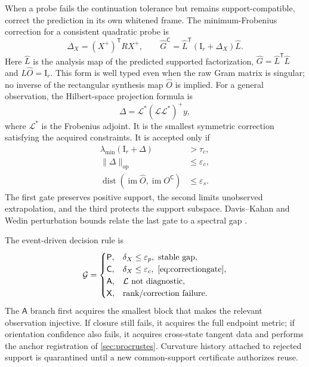 \documentclass[10pt,twocolumn]{article}
\newcommand{\cref}[1]{\autoref{#1}}
\theoremstyle{definition}
\theoremstyle{remark}
\newcommand{\Id}{\mathrm I}
\newcommand{\im}{\operatorname{im}}
\newcommand{\dist}{\operatorname{dist}}
\newcommand{\op}{\mathrm{op}}
\newcommand{\A}{\mathsf A}
\newcommand{\Prd}{\mathsf P}
\newcommand{\Cor}{\mathsf C}
\newcommand{\Inv}{\mathsf X}
\begin{document}
When a probe fails the continuation tolerance but remains support-compatible, correct the prediction in its own whitened frame.  The minimum-Frobenius correction for a consistent quadratic probe is
\begin{equation}
 \Delta_X=(X^+)^{\mathsf T}RX^+,\qquad
 \widehat G^{\Cor}=\widehat L^{\mathsf T}(\Id_r+\Delta_X)\widehat L.
 \label{eq:mincorrection}
\end{equation}
Here $\widehat L$ is the analysis map of the predicted supported factorization,
$\widehat G=\widehat L^{\mathsf T}\widehat L$ and
$\widehat L\widehat O=\Id_r$.  This form is well typed even when the raw Gram
matrix is singular; no inverse of the rectangular synthesis map $\widehat O$
is implied.
For a general observation, the Hilbert-space projection formula is
\begin{equation}
 \Delta=\mathcal L^*(\mathcal L\mathcal L^*)^+y,
 \label{eq:operatorcorrection}
\end{equation}
where $\mathcal L^*$ is the Frobenius adjoint.  It is the smallest symmetric correction satisfying the acquired constraints.  It is accepted only if
\begin{align}
 \lambda_{\min}(\Id_r+\Delta)&>\tau_c,\nonumber\\
 \|\Delta\|_{\op}&\le\varepsilon_c,\nonumber\\
 \dist(\im\widehat O,\im O^{\Cor})&\le\varepsilon_s.
 \label{eq:correctiongate}
\end{align}
The first gate preserves positive support, the second limits unobserved extrapolation, and the third protects the support subspace.  Davis--Kahan and Wedin perturbation bounds relate the last gate to a spectral gap \cite{DavisKahan1970,Wedin1972}.

The event-driven decision rule is
\begin{equation}
 \mathcal G=
 \begin{cases}
 \Prd,&\delta_X\le\varepsilon_p,\ \text{stable gap},\\
 \Cor,&\delta_X\le\varepsilon_c,\ \eqref{eq:correctiongate},\\
 \A,&\mathcal L\ \text{not diagnostic},\\
 \Inv,&\text{rank/correction failure}.
 \end{cases}
 \label{eq:escalation}
\end{equation}
The $\A$ branch first acquires the smallest block that makes the relevant observation injective.  If closure still fails, it acquires the full endpoint metric; if orientation confidence also fails, it acquires cross-state tangent data and performs the anchor registration of \cref{sec:procrustes}.  Curvature history attached to rejected support is quarantined until a new common-support certificate authorizes reuse.
\end{document}
